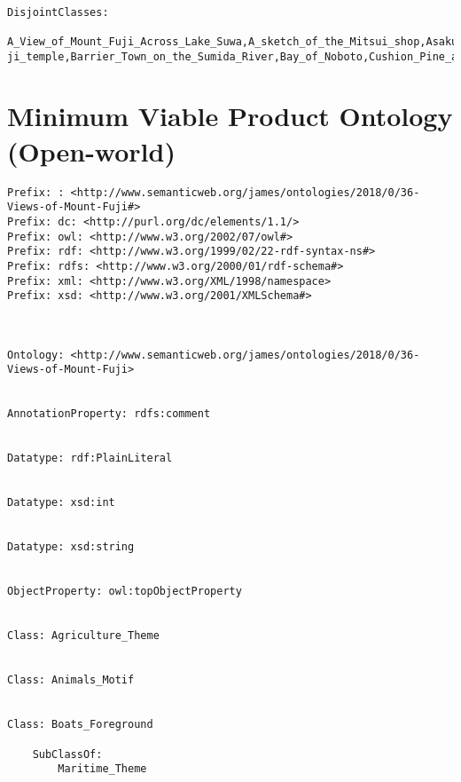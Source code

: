 \documentclass[titlepage,a4paper,12pt,oneside]{book}
\begin{document}
\begin{appendices}
\begin{lstlisting}
    
DisjointClasses: 
    A_View_of_Mount_Fuji_Across_Lake_Suwa,A_sketch_of_the_Mitsui_shop,Asakusa_Hongan-ji_temple,Barrier_Town_on_the_Sumida_River,Bay_of_Noboto,Cushion_Pine_at_Aoyama,Ejiri_in_Suruga_Province,Enoshima_in_Sagami_Province,Fuji_View_Field_in_Owari_Province,Hodogaya_on_the_Tokaido,Inume_Pass_Koshu,Kajikazawa_in_Kai_Province,Mishima_Pass_in_Kai_Province,Mount_Fuji_from_the_mountains_of_Totomi,Mount_Fuji_reflects_in_Lake_Kawaguchi,Nihonbashi_bridge_in_Edo,Rainstorm_Beneath_the_Summit,Sazai_hall_Temple_of_Five_Hundred_Raken,Senju_Musashi_Province,Shichiri_beach_in_Sagami_Province,Shimomeguro,Shore_of_Tago_Bay_Ejiri_at_Tokaido,South_Wind_Clear_Sky,Sundai_Edo,Sunset_across_the_Ryogoku_bridge,Tama_River_in_Musashi_Province,Tea_house_at_Koishikawa,The_Great_Wave_off_Kanagawa,The_Kazusa_Province_sea_route,The_lake_of_Hakone_in_Sagami_Province,Tsukuda_Island_in_Musashi_Province,Umezawa_in_Sagami_Province,Under_Mannen_Bridge_at_Fukagawa,Ushibori_in_Hitachi_Province,Watermill_at_Onden,Yoshida_at_Tokaido
\end{lstlisting}

\chapter{Minimum Viable Product Ontology (Open-world)}
\begin{lstlisting}
Prefix: : <http://www.semanticweb.org/james/ontologies/2018/0/36-Views-of-Mount-Fuji#>
Prefix: dc: <http://purl.org/dc/elements/1.1/>
Prefix: owl: <http://www.w3.org/2002/07/owl#>
Prefix: rdf: <http://www.w3.org/1999/02/22-rdf-syntax-ns#>
Prefix: rdfs: <http://www.w3.org/2000/01/rdf-schema#>
Prefix: xml: <http://www.w3.org/XML/1998/namespace>
Prefix: xsd: <http://www.w3.org/2001/XMLSchema#>



Ontology: <http://www.semanticweb.org/james/ontologies/2018/0/36-Views-of-Mount-Fuji>


AnnotationProperty: rdfs:comment

    
Datatype: rdf:PlainLiteral

    
Datatype: xsd:int

    
Datatype: xsd:string

    
ObjectProperty: owl:topObjectProperty
   
    
Class: Agriculture_Theme

    
Class: Animals_Motif

    
Class: Boats_Foreground

    SubClassOf: 
        Maritime_Theme
    

\end{lstlisting}
\end{appendices}
\end{document}
